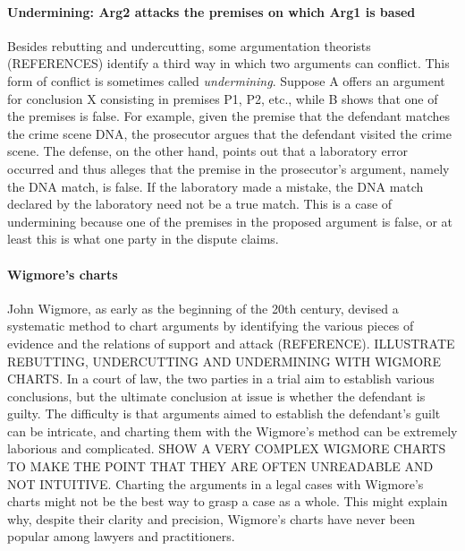 \documentclass[10pt]{article}
\begin{document}
\paragraph{Undermining: Arg2 attacks the premises on which Arg1 is based}

Besides rebutting and undercutting, some argumentation theorists (REFERENCES) identify a third way in which 
two arguments can conflict. This form of conflict is sometimes called \textit{undermining}.
Suppose A offers an argument for conclusion X consisting in premises P1, P2, etc., 
while B shows that one of the premises is false. For example, given the premise that the defendant 
matches the crime scene DNA, the prosecutor argues 
that the defendant visited the crime scene. The defense, on the other hand, points out that 
a laboratory error occurred and thus alleges that the premise in the prosecutor's 
argument, namely the DNA match, is false. If the laboratory made a mistake, the DNA match declared by the laboratory  need not 
be a true match.  This is a case of undermining because one of the premises 
in the proposed argument is false, or at least this is what one party in the dispute claims.
 
\paragraph{Wigmore's charts} 
John Wigmore, as early as the beginning of the 20th century, devised a systematic method to chart arguments by identifying the
 various pieces of evidence and the relations of support and attack (REFERENCE). ILLUSTRATE REBUTTING, UNDERCUTTING AND UNDERMINING WITH WIGMORE CHARTS.
 In a court of law, the two parties in a trial aim to establish various conclusions, 
but the ultimate conclusion at issue is whether the defendant is guilty.  
The difficulty is that arguments aimed to establish the defendant's guilt can 
be intricate, and charting them with the Wigmore's method
can be extremely laborious and complicated.  SHOW A VERY COMPLEX WIGMORE CHARTS TO MAKE THE POINT THAT THEY 
  ARE OFTEN UNREADABLE AND NOT INTUITIVE. 
 Charting the arguments in a legal cases with Wigmore's charts might not be the best way to grasp a 
case as a whole. This might explain 
why, despite their clarity and precision, Wigmore's charts have 
 never been popular among lawyers and practitioners. 
\end{document}
